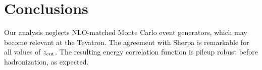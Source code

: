 \section{Conclusions}\label{sec:conclusions}

Our analysis neglects NLO-matched Monte Carlo event generators, which
may become relevant at the Tevatron. The agreement with Sherpa is
remarkable for all values of $z_{\rm cut}$. The resulting energy
correlation function is pileup robust before hadronization, as expected.

